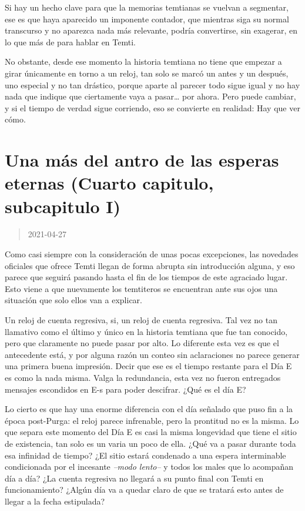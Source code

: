 \documentclass[
  spanish,
]{book}
\begin{document}
Si hay un hecho clave para que la memorias temtianas se vuelvan a segmentar, ese es que haya aparecido un imponente contador, que mientras siga su normal transcurso y no aparezca nada más relevante, podría convertirse, sin exagerar, en lo que más de para hablar en Temti.

No obstante, desde ese momento la historia temtiana no tiene que empezar a girar únicamente en torno a un reloj, tan solo se marcó un antes y un después, uno especial y no tan drástico, porque aparte al parecer todo sigue igual y no hay nada que indique que ciertamente vaya a pasar\ldots{} por ahora.
Pero puede cambiar, y si el tiempo de verdad sigue corriendo, eso se convierte en realidad: Hay que ver cómo.

\hypertarget{una-muxe1s-del-antro-de-las-esperas-eternas-cuarto-capitulo-subcapitulo-i}{%
\section{Una más del antro de las esperas eternas (Cuarto capitulo, subcapitulo I)}\label{una-muxe1s-del-antro-de-las-esperas-eternas-cuarto-capitulo-subcapitulo-i}}

\begin{quote}
2021-04-27
\end{quote}

Como casi siempre con la consideración de unas pocas excepciones, las novedades oficiales que ofrece Temti llegan de forma abrupta sin introducción alguna, y eso parece que seguirá pasando hasta el fin de los tiempos de este agraciado lugar. Esto viene a que nuevamente los temtiteros se encuentran ante sus ojos una situación que solo ellos van a explicar.

Un reloj de cuenta regresiva, si, un reloj de cuenta regresiva. Tal vez no tan llamativo como el último y único en la historia temtiana que fue tan conocido, pero que claramente no puede pasar por alto. Lo diferente esta vez es que el antecedente está, y por alguna razón un conteo sin aclaraciones no parece generar una primera buena impresión. Decir que ese es el tiempo restante para el Día E es como la nada misma. Valga la redundancia, esta vez no fueron entregados mensajes escondidos en E-s para poder descifrar. ¿Qué es el día E?

Lo cierto es que hay una enorme diferencia con el día señalado que puso fin a la época post-Purga: el reloj parece infrenable, pero la prontitud no es la misma. Lo que separa este momento del Día E es casi la misma longevidad que tiene el sitio de existencia, tan solo es un varia un poco de ella. ¿Qué va a pasar durante toda esa infinidad de tiempo? ¿El sitio estará condenado a una espera interminable condicionada por el incesante \emph{--modo lento--} y todos los males que lo acompañan día a día? ¿La cuenta regresiva no llegará a su punto final con Temti en funcionamiento? ¿Algún día va a quedar claro de que se tratará esto antes de llegar a la fecha estipulada?
\end{document}
